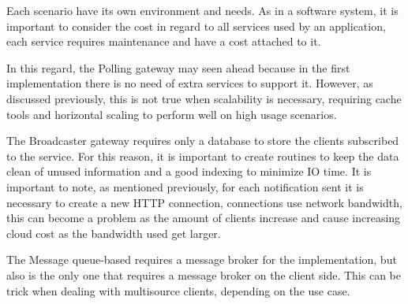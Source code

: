 Each scenario have its own environment and needs. As in a software system, it is important to consider the cost in regard to all services used by an application, each service requires maintenance and have a cost attached to it.

In this regard, the Polling gateway may seen ahead because in the first implementation there is no need of extra services to support it. However, as discussed previously, this is not true when scalability is necessary, requiring cache tools and horizontal scaling to perform well on high usage scenarios.

The Broadcaster gateway requires only a database to store the clients subscribed to the service. For this reason, it is important to create routines to keep the data clean of unused information and a good indexing to minimize IO time. It is important to note, as mentioned previously, for each notification sent it is necessary to create a new HTTP connection, connections use network bandwidth, this can become a problem as the amount of clients increase and cause increasing cloud cost as the bandwidth used get larger.

The Message queue-based requires a message broker for the implementation, but also is the only one that requires a message broker on the client side. This can be trick when dealing with multisource clients, depending on the use case.
